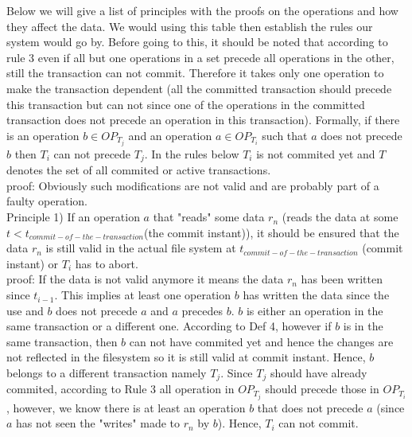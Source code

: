\documentclass[a4paper, 11pt]{article}
\begin{document}
Below we will give a list of principles with the proofs on the operations and how they affect the data. We would using this table then establish the rules our system would go by. Before going to this, it should be noted that according to rule 3 even if all but one operations in a set precede all operations in the other, still the transaction can not commit. Therefore it takes only one operation to make the transaction dependent (all the committed transaction should precede this transaction but can not since one of the operations in the committed transaction does not precede an operation in this transaction). Formally, if there is an operation $b \in OP_{T_j}$ and an operation $a \in OP_{T_i}$ such that $a$ does not precede $b$ then $T_i$ can not precede $T_j$. In the rules below $T_i$ is not commited yet and $T$ denotes the set of all commited or active transactions. \\





proof: Obviously such modifications are not valid and are probably part of a faulty operation.\\


Principle 1) If an operation $a$ that "reads" some data $r_n$ (reads the data at some $t < t_{commit-of-the-transaction}$(the commit instant)), it should be ensured that the data $r_n$ is still valid in the actual file system at $t_{commit-of-the-transaction}$ (commit instant) or $T_i$ has to abort.\\

proof: If the data is not valid anymore it means the data $r_n$ has been written since $t_{i-1}$. This implies at least one operation $b$ has written the data since the use and $b$ does not precede $a$ and $a$ precedes $b$. $b$ is either an operation in the same transaction or a different one. According to Def 4, however if $b$ is in the same transaction, then $b$ can not have commited yet and hence the changes are not reflected in the filesystem so it is still valid at commit instant. Hence, $b$ belongs to a different transaction namely $T_j$. Since $T_j$ should have already commited, according to Rule 3 all operation in $OP_{T_j}$ should precede those in $OP_{T_i}$, however, we know there is at least an operation $b$ that does not precede $a$ (since $a$ has not seen the "writes" made to $r_n$ by $b$). Hence, $T_i$ can not commit.\\
\end{document}
